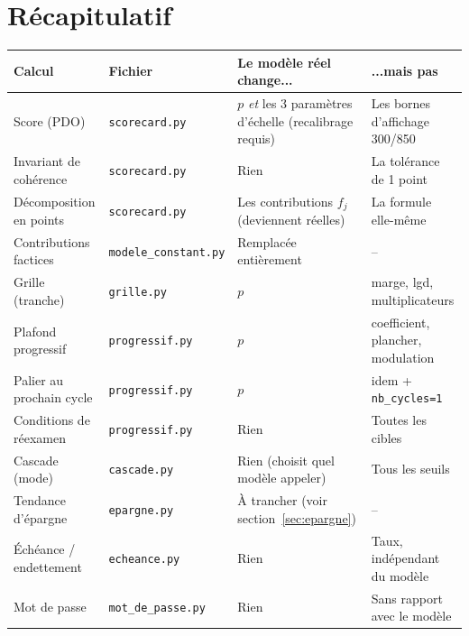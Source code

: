 \documentclass[11pt,a4paper]{article}
\begin{document}
\newpage

\section*{Récapitulatif}

\begin{longtable}{@{}L{4cm}L{3.4cm}L{3cm}L{3.2cm}@{}}
\toprule
Calcul & Fichier & Le modèle réel change... & ...mais pas \\
\midrule
\endhead
Score (PDO) & \texttt{scorecard.py} & $p$ \emph{et} les 3 paramètres d'échelle (recalibrage
  requis) & Les bornes d'affichage 300/850 \\
Invariant de cohérence & \texttt{scorecard.py} & Rien & La tolérance de 1 point \\
Décomposition en points & \texttt{scorecard.py} & Les contributions $f_j$ (deviennent réelles) &
  La formule elle-même \\
Contributions factices & \texttt{modele\_\allowbreak constant.py} & Remplacée entièrement & -- \\
Grille (tranche) & \texttt{grille.py} & $p$ & marge, lgd, multiplicateurs \\
Plafond progressif & \texttt{progressif.py} & $p$ & coefficient, plancher, modulation \\
Palier au prochain cycle & \texttt{progressif.py} & $p$ & idem + \texttt{nb\_cycles=1} \\
Conditions de réexamen & \texttt{progressif.py} & Rien & Toutes les cibles \\
Cascade (mode) & \texttt{cascade.py} & Rien (choisit quel modèle appeler) & Tous les seuils \\
Tendance d'épargne & \texttt{epargne.py} & À trancher (voir section~\ref{sec:epargne}) & -- \\
Échéance / endettement & \texttt{echeance.py} & Rien & Taux, indépendant du modèle \\
Mot de passe & \texttt{mot\_de\_\allowbreak passe.py} & Rien & Sans rapport avec le modèle \\
\bottomrule
\end{longtable}
\end{document}
